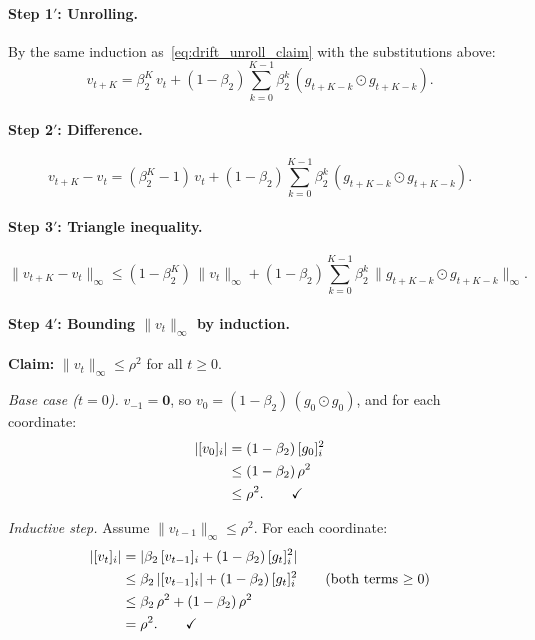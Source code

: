 \documentclass{article}
\begin{document}
\paragraph{Step 1$'$: Unrolling.}
By the same induction as~\eqref{eq:drift_unroll_claim} with the
substitutions above:
\begin{equation}
v_{t+K} = \beta_2^K\,v_t
+ (1-\beta_2)\sum_{k=0}^{K-1}\beta_2^k\,(g_{t+K-k} \odot g_{t+K-k}).
\label{eq:drift_v_unroll}
\end{equation}

\paragraph{Step 2$'$: Difference.}
\begin{equation}
v_{t+K} - v_t
= (\beta_2^K - 1)\,v_t
+ (1-\beta_2)\sum_{k=0}^{K-1}\beta_2^k\,(g_{t+K-k} \odot g_{t+K-k}).
\label{eq:drift_v_diff}
\end{equation}

\paragraph{Step 3$'$: Triangle inequality.}
\begin{equation}
\|v_{t+K} - v_t\|_\infty
\leq (1-\beta_2^K)\,\|v_t\|_\infty
+ (1-\beta_2)\sum_{k=0}^{K-1}\beta_2^k\,\|g_{t+K-k} \odot g_{t+K-k}\|_\infty.
\label{eq:drift_v_triangle}
\end{equation}

\paragraph{Step 4$'$: Bounding $\|v_t\|_\infty$ by induction.}

\noindent\textbf{Claim:} $\|v_t\|_\infty \leq \rho^2$ for all $t \geq 0$.

\emph{Base case ($t = 0$).}
$v_{-1} = \mathbf{0}$, so
$v_0 = (1-\beta_2)\,(g_0 \odot g_0)$, and for each coordinate:
\begin{align}
|[v_0]_i|
&= (1-\beta_2)\,[g_0]_i^2 \notag \\
&\leq (1-\beta_2)\,\rho^2 \notag \\
&\leq \rho^2. \qquad\checkmark
\label{eq:drift_v0_bound}
\end{align}

\emph{Inductive step.}
Assume $\|v_{t-1}\|_\infty \leq \rho^2$. For each coordinate:
\begin{align}
|[v_t]_i|
&= |\beta_2\,[v_{t-1}]_i + (1-\beta_2)\,[g_t]_i^2|
\notag \\
&\leq \beta_2\,|[v_{t-1}]_i| + (1-\beta_2)\,[g_t]_i^2
\qquad\text{(both terms $\geq 0$)}
\notag \\
&\leq \beta_2\,\rho^2 + (1-\beta_2)\,\rho^2
\notag \\
&= \rho^2. \qquad\checkmark
\label{eq:drift_v_induction}
\end{align}
\end{document}
